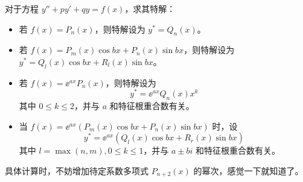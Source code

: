 对于方程 $y'' + py' + qy = f(x)$，求其特解：

\begin{itemize}
	\item 若 $f(x) = P_n(x)$，则特解设为 $y^* = Q_n(x)$。
	\item 若 $f(x) = P_m(x) \cos b x + P_n(x) \sin b x$，则特解设为 $y^* = Q_l(x) \cos b x + R_l(x) \sin b x$。
	\item 若 $f(x) = \ee^{a x} P_n(x)$，则特解设为
	      \[ y^* = \ee^{ax} Q_n(x) x^k \]
	      其中 $0 \leqslant k \leqslant 2$，并与 $a$ 和特征根重合数有关。
	\item 当 $f(x) = \ee^{ax}\left( P_m(x) \cos b x + P_n(x) \sin b x \right)$ 时，设
	      \[ y^* = \ee^{ax}\left( Q_l(x) \cos b x + R_r(x) \sin b x \right) \]
	      其中 $l = \max(n, m), 0 \leqslant k \leqslant 1$，并与 $a \pm bi$ 和特征根重合数有关。
\end{itemize}

具体计算时，不妨增加待定系数多项式 $P_{n+2}(x)$ 的幂次，感觉一下就知道了。
